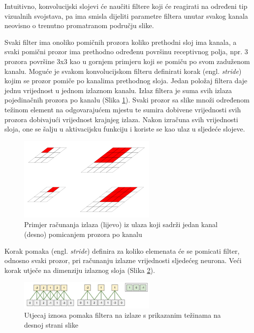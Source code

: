 \documentclass[times, utf8, proizvoljni, numeric]{fer}
\begin{document}
Intuitivno, konvolucijski slojevi će naučiti filtere koji će reagirati na određeni tip vizualnih svojstava, pa ima smisla dijeliti parametre filtera unutar svakog kanala neovisno o trenutno promatranom području slike.

Svaki filter ima onoliko pomičnih prozora koliko prethodni sloj ima kanala, a svaki pomični prozor ima prethodno određenu površinu receptivnog polja, npr. 3 prozora površine 3x3 kao u gornjem primjeru koji se pomiču po svom zaduženom kanalu. Moguće je svakom konvolucijskom filteru definirati korak (engl. \textit{stride}) kojim se prozor pomiče po kanalima prethodnog sloja. Jedan položaj filtera daje jednu vrijednost u jednom izlaznom kanalu. Izlaz filtera je suma svih izlaza pojedinačnih prozora po kanalu (Slika \ref{fg:konvolucija}). Svaki prozor sa slike množi određenom težinom element na odgovarajućem mjestu te sumira dobivene vrijednosti svih prozora dobivajući vrijednost krajnjeg izlaza. Nakon izračuna svih vrijednosti sloja, one se šalju u aktivacijsku funkciju i koriste se kao ulaz u sljedeće slojeve. 

\begin{figure}[!ht]
	\begin{center}
		\captionsetup{justification=centering}
		\includegraphics[width=0.6\textwidth]{./imgs/konvolucija.png}
		\caption{Primjer računanja izlaza (lijevo) iz ulaza koji sadrži jedan kanal (desno) pomicanjem prozora po kanalu \cite{DubokoUcenje}}
		\label{fg:konvolucija}
	\end{center}
\end{figure}

Korak pomaka (engl. \textit{stride}) definira za koliko elemenata će se pomicati filter, odnosno svaki prozor, pri računanju izlazne vrijednosti sljedećeg neurona. Veći korak utječe na dimenziju izlaznog sloja (Slika \ref{fg:pomak}).

\begin{figure}[!ht]
	\begin{center}
		\captionsetup{justification=centering}
		\includegraphics[width=0.6\textwidth]{./imgs/pomak.png}
		\caption{Utjecaj iznosa pomaka filtera na izlaze s prikazanim težinama na desnoj strani slike \cite{CS231n}}
		\label{fg:pomak}
	\end{center}
\end{figure}
\end{document}
